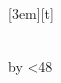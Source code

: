\usepackage{draftwatermark}

\makeatletter
 \newsavebox{\@linebox}
 \savebox{\@linebox}[3em][t]{\parbox[t]{3em}{%
   \@tempcnta\@ne\relax
   \loop{\underline{\scriptsize\the\@tempcnta}}\\
     \advance\@tempcnta by \@ne\ifnum\@tempcnta<48\repeat}}
\makeatother